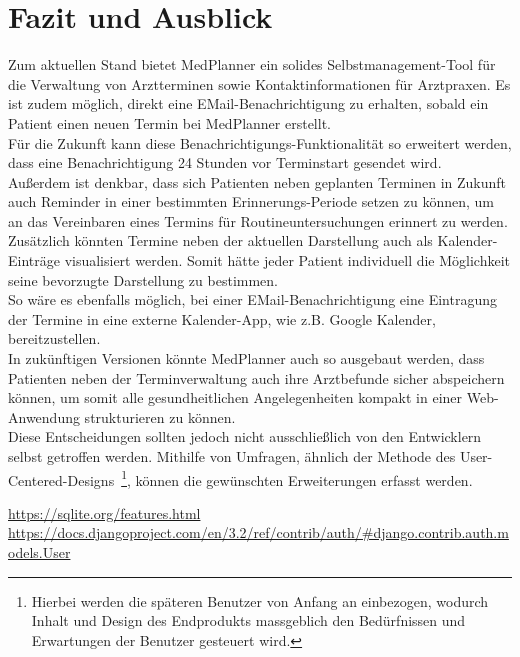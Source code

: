 \documentclass[conference]{IEEEtran}
\begin{document}
\section{Fazit und Ausblick}
Zum aktuellen Stand bietet MedPlanner ein solides Selbstmanagement-Tool für die Verwaltung von Arztterminen sowie Kontaktinformationen für Arztpraxen. Es ist zudem möglich, direkt eine EMail-Benachrichtigung zu erhalten, sobald ein Patient einen neuen Termin bei MedPlanner erstellt.\\
Für die Zukunft kann diese Benachrichtigungs-Funktionalität so erweitert werden, dass eine Benachrichtigung 24 Stunden vor Terminstart gesendet wird.\\
Außerdem ist denkbar, dass sich Patienten neben geplanten Terminen in Zukunft auch Reminder in einer bestimmten Erinnerungs-Periode setzen zu können, um an das Vereinbaren eines Termins für Routineuntersuchungen erinnert zu werden.\\
Zusätzlich könnten Termine neben der aktuellen Darstellung auch als Kalender-Einträge visualisiert werden. Somit hätte jeder Patient individuell die Möglichkeit seine bevorzugte Darstellung zu bestimmen.\\ 
So wäre es ebenfalls möglich, bei einer EMail-Benachrichtigung eine Eintragung der Termine in eine externe Kalender-App, wie z.B. Google Kalender, bereitzustellen.\\
In zukünftigen Versionen könnte MedPlanner auch so ausgebaut werden, dass Patienten neben der Terminverwaltung auch ihre Arztbefunde sicher abspeichern können, um somit alle gesundheitlichen Angelegenheiten kompakt in einer Web-Anwendung strukturieren zu können.\\
Diese Entscheidungen sollten jedoch nicht ausschließlich von den Entwicklern selbst getroffen werden. Mithilfe von Umfragen, ähnlich der Methode des User-Centered-Designs~\footnote{Hierbei werden die späteren Benutzer von Anfang an einbezogen, wodurch Inhalt und Design des Endprodukts massgeblich den Bedürfnissen und Erwartungen der Benutzer gesteuert wird.}, können die gewünschten Erweiterungen erfasst werden.

\begin{thebibliography}{00}
 \url{https://sqlite.org/features.html}
 \url{https://docs.djangoproject.com/en/3.2/ref/contrib/auth/#django.contrib.auth.models.User}
\end{thebibliography}
\end{document}
